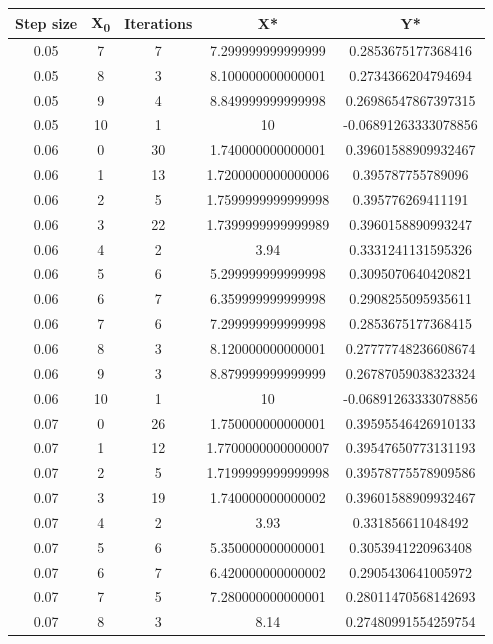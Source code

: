 \documentclass[paper=a4, fontsize=11pt]{scrartcl} %
\numberwithin{equation}{section} %
\numberwithin{figure}{section} %
\numberwithin{table}{section} %
\begin{document}
\begin{center}
\begin{tabular}{ |c|c|c|c|c| } 
	\hline
	\textbf{Step size} & \textbf{X\textsubscript{0}} & \textbf{Iterations} & \textbf{X*} & \textbf{Y*} \\ 
	\hline
        0.05 & 7 & 7 & 7.299999999999999 & 0.2853675177368416 \\
    0.05 & 8 & 3 & 8.100000000000001 & 0.2734366204794694 \\
    0.05 & 9 & 4 & 8.849999999999998 & 0.26986547867397315 \\
    0.05 & 10 & 1 & 10 & -0.06891263333078856 \\
    0.06 & 0 & 30 & 1.740000000000001 & 0.39601588909932467 \\
    0.06 & 1 & 13 & 1.7200000000000006 & 0.395787755789096 \\
    0.06 & 2 & 5 & 1.7599999999999998 & 0.395776269411191 \\
    0.06 & 3 & 22 & 1.7399999999999989 & 0.3960158890993247 \\
    0.06 & 4 & 2 & 3.94 & 0.3331241131595326 \\
    0.06 & 5 & 6 & 5.299999999999998 & 0.3095070640420821 \\
    0.06 & 6 & 7 & 6.359999999999998 & 0.2908255095935611 \\
    0.06 & 7 & 6 & 7.299999999999998 & 0.2853675177368415 \\
    0.06 & 8 & 3 & 8.120000000000001 & 0.27777748236608674 \\
    0.06 & 9 & 3 & 8.879999999999999 & 0.26787059038323324 \\
    0.06 & 10 & 1 & 10 & -0.06891263333078856 \\
    0.07 & 0 & 26 & 1.750000000000001 & 0.39595546426910133 \\
    0.07 & 1 & 12 & 1.7700000000000007 & 0.39547650773131193 \\
    0.07 & 2 & 5 & 1.7199999999999998 & 0.39578775578909586 \\
    0.07 & 3 & 19 & 1.740000000000002 & 0.39601588909932467 \\
    0.07 & 4 & 2 & 3.93 & 0.331856611048492 \\
    0.07 & 5 & 6 & 5.350000000000001 & 0.3053941220963408 \\
    0.07 & 6 & 7 & 6.420000000000002 & 0.2905430641005972 \\
    0.07 & 7 & 5 & 7.280000000000001 & 0.28011470568142693 \\
    0.07 & 8 & 3 & 8.14 & 0.27480991554259754 \\

\end{tabular}
\end{center}
\end{document}
